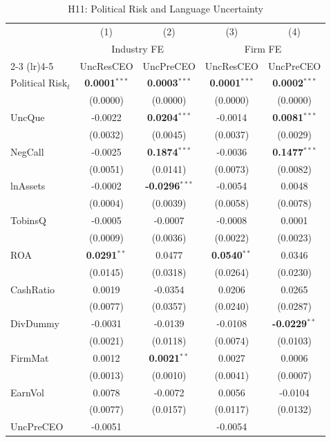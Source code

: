 \documentclass[11pt,a4paper]{article}
\begin{document}
\begin{table}[htbp]
\centering
\caption{H11: Political Risk and Language Uncertainty}
\label{tab:h11_prisk_uncertainty}
\scriptsize
\begin{tabular}{lcccc}
\toprule
 & (1) & (2) & (3) & (4) \\
 & \multicolumn{2}{c}{Industry FE} & \multicolumn{2}{c}{Firm FE} \\
\cmidrule(lr){2-3} \cmidrule(lr){4-5}
 & UncResCEO & UncPreCEO & UncResCEO & UncPreCEO \\
\midrule
Political Risk$_{t}$ & \textbf{0.0001}$^{***}$ & \textbf{0.0003}$^{***}$ & \textbf{0.0001}$^{***}$ & \textbf{0.0002}$^{***}$ \\
 & (0.0000) & (0.0000) & (0.0000) & (0.0000) \\
\midrule
UncQue & -0.0022 & \textbf{0.0204}$^{***}$ & -0.0014 & \textbf{0.0081}$^{***}$ \\
 & (0.0032) & (0.0045) & (0.0037) & (0.0029) \\
NegCall & -0.0025 & \textbf{0.1874}$^{***}$ & -0.0036 & \textbf{0.1477}$^{***}$ \\
 & (0.0051) & (0.0141) & (0.0073) & (0.0082) \\
lnAssets & -0.0002 & \textbf{-0.0296}$^{***}$ & -0.0054 & 0.0048 \\
 & (0.0004) & (0.0039) & (0.0058) & (0.0078) \\
TobinsQ & -0.0005 & -0.0007 & -0.0008 & 0.0001 \\
 & (0.0009) & (0.0036) & (0.0022) & (0.0023) \\
ROA & \textbf{0.0291}$^{**}$ & 0.0477 & \textbf{0.0540}$^{**}$ & 0.0346 \\
 & (0.0145) & (0.0318) & (0.0264) & (0.0230) \\
CashRatio & 0.0019 & -0.0354 & 0.0206 & 0.0265 \\
 & (0.0077) & (0.0357) & (0.0240) & (0.0287) \\
DivDummy & -0.0031 & -0.0139 & -0.0108 & \textbf{-0.0229}$^{**}$ \\
 & (0.0021) & (0.0118) & (0.0074) & (0.0103) \\
FirmMat & 0.0012 & \textbf{0.0021}$^{**}$ & 0.0027 & 0.0006 \\
 & (0.0013) & (0.0010) & (0.0041) & (0.0007) \\
EarnVol & 0.0078 & -0.0072 & 0.0056 & -0.0104 \\
 & (0.0077) & (0.0157) & (0.0117) & (0.0132) \\
UncPreCEO & -0.0051 &  & -0.0054 &  \\

\end{tabular}
\end{table}
\end{document}

